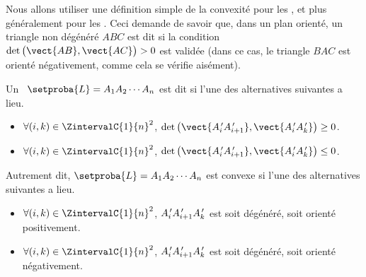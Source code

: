 Nous allons utiliser une définition simple de la convexité pour les \ngones, et plus généralement pour les \ncycles. Ceci demande de savoir que, dans un plan orienté, un triangle non dégénéré $ABC$ est dit  si la condition $\det \big( \vect{AB} , \vect{AC} \big) > 0$ est validée (dans ce cas, le triangle $BAC$ est orienté négativement, comme cela se vérifie aisément).




\begin{defi} \label{ncycle-def}
	Un \ncycle\ $\setproba{L} = A_1 A_2 \cdots A_n$ est dit  si  l'une des alternatives suivantes a lieu.
	\begin{itemize}
		\item $\forall (i, k) \in \ZintervalC{1}{n}^2$,
		$\det \big( \vect{\primeit{A}_i \primeit{A}_{i+1}}, \vect{\primeit{A}_i \primeit{A}_k} \big) \geq 0$.

		\item $\forall (i, k) \in \ZintervalC{1}{n}^2$,
		$\det \big( \vect{\primeit{A}_i \primeit{A}_{i+1}}, \vect{\primeit{A}_i \primeit{A}_k} \big) \leq 0$.
    \end{itemize}
	
	Autrement dit, $\setproba{L} = A_1 A_2 \cdots A_n$ est convexe si l'une des alternatives suivantes a lieu.
	\begin{itemize}
		\item $\forall (i, k) \in \ZintervalC{1}{n}^2$,
		$A^{\,\prime}_i A^{\,\prime}_{i+1} A^{\,\prime}_k$ est soit dégénéré, soit  orienté positivement.

		\item $\forall (i, k) \in \ZintervalC{1}{n}^2$,
		$A^{\,\prime}_i A^{\,\prime}_{i+1} A^{\,\prime}_k$ est soit dégénéré, soit  orienté négativement.
    \end{itemize}
\end{defi}


